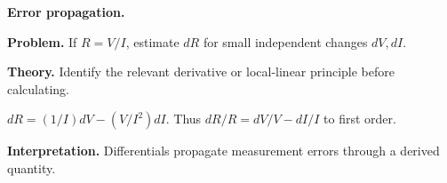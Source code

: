 \begin{workedexample}
\textbf{Error propagation.}\par
\textbf{Problem.} If $R=V/I$, estimate $dR$ for small independent changes $dV,dI$.

\textbf{Theory.} Identify the relevant derivative or local-linear principle before calculating.

\begin{solution}
$dR=(1/I)dV-(V/I^2)dI$. Thus $dR/R=dV/V-dI/I$ to first order.

\textbf{Interpretation.} Differentials propagate measurement errors through a derived quantity.
\end{solution}
\end{workedexample}
